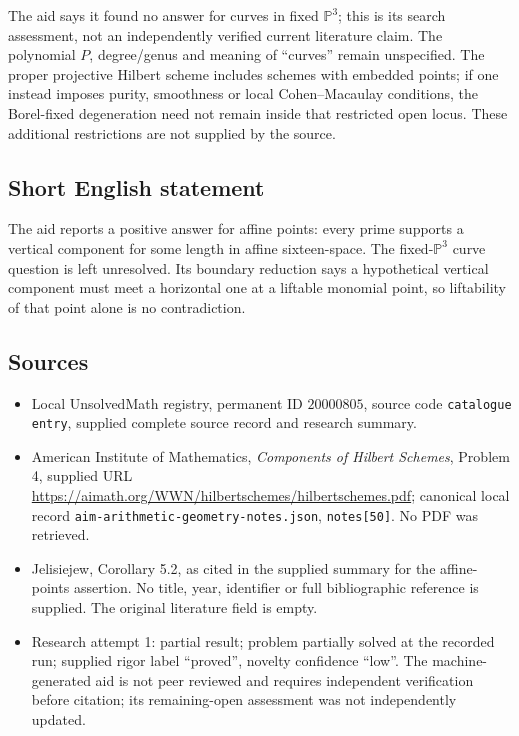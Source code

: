 \documentclass[11pt]{article}
\newcommand{\PP}{\mathbb{P}}
\begin{document}
The aid says it found no answer for curves in fixed $\PP^3$; this is its search assessment, not an independently verified current literature claim. The polynomial $P$, degree/genus and meaning of ``curves'' remain unspecified. The proper projective Hilbert scheme includes schemes with embedded points; if one instead imposes purity, smoothness or local Cohen--Macaulay conditions, the Borel-fixed degeneration need not remain inside that restricted open locus. These additional restrictions are not supplied by the source.
\subsection{Short English statement}
The aid reports a positive answer for affine points: every prime supports a vertical component for some length in affine sixteen-space. The fixed-$\PP^3$ curve question is left unresolved. Its boundary reduction says a hypothetical vertical component must meet a horizontal one at a liftable monomial point, so liftability of that point alone is no contradiction.
\subsection{Sources}
\begin{itemize}
\item Local UnsolvedMath registry, permanent ID $20000805$, source code \texttt{catalogue entry}, supplied complete source record and research summary.
\item American Institute of Mathematics, \emph{Components of Hilbert Schemes}, Problem 4, supplied URL \url{https://aimath.org/WWN/hilbertschemes/hilbertschemes.pdf}; canonical local record \texttt{aim-arithmetic-geometry-notes.json}, \texttt{notes[50]}. No PDF was retrieved.
\item Jelisiejew, Corollary 5.2, as cited in the supplied summary for the affine-points assertion. No title, year, identifier or full bibliographic reference is supplied. The original literature field is empty.
\item Research attempt 1: partial result; problem partially solved at the recorded run; supplied rigor label ``proved'', novelty confidence ``low''. The machine-generated aid is not peer reviewed and requires independent verification before citation; its remaining-open assessment was not independently updated.
\end{itemize}
\end{document}
